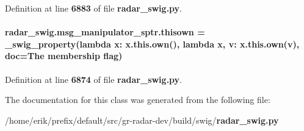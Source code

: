 Definition at line {\bf 6883} of file {\bf radar\+\_\+swig.\+py}.

\paragraph[{thisown}]{\setlength{\rightskip}{0pt plus 5cm}radar\+\_\+swig.\+msg\+\_\+manipulator\+\_\+sptr.\+thisown = {\bf \+\_\+swig\+\_\+property}(lambda x\+: x.\+this.\+own(), lambda {\bf x}, v\+: x.\+this.\+own(v), doc=\textquotesingle{}The membership flag\textquotesingle{})\hspace{0.3cm}{\ttfamily [static]}}\label{classradar__swig_1_1msg__manipulator__sptr_a14d170325f9f2d103777920cdd593114}


Definition at line {\bf 6874} of file {\bf radar\+\_\+swig.\+py}.



The documentation for this class was generated from the following file\+:\begin{DoxyCompactItemize}
\item 
/home/erik/prefix/default/src/gr-\/radar-\/dev/build/swig/{\bf radar\+\_\+swig.\+py}\end{DoxyCompactItemize}

